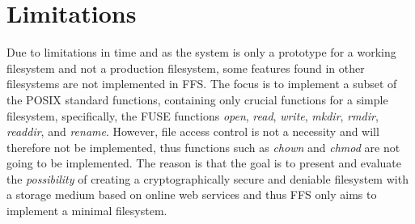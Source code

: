 \section{Limitations} %
\label{sec:delim}

Due to limitations in time and as the system is only a prototype for a working filesystem and not a production filesystem, some features found in other filesystems are not implemented in \gls{FFS}. The focus is to implement a subset of the POSIX standard functions, containing only crucial functions for a simple filesystem, specifically, the \gls{FUSE} functions \textit{open}, \textit{read}, \textit{write}, \textit{mkdir}, \textit{rmdir}, \textit{readdir}, and \textit{rename}. However, file access control is not a necessity and will therefore not be implemented, thus functions such as \textit{chown} and \textit{chmod} are not going to be implemented. The reason is that the goal is to present and evaluate the \textit{possibility} of creating a cryptographically secure and deniable filesystem with a storage medium based on online web services and thus \gls{FFS} only aims to implement a minimal filesystem.